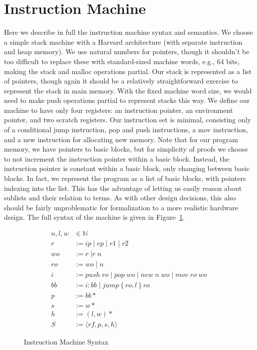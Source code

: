 \section{Instruction Machine} \label{sec:im_semantics}

Here we describe in full the instruction machine syntax and semantics. We
choose a simple stack machine with a Harvard architecture (with separate
instruction and heap memory). We use natural numbers for pointers, though it
shouldn't be too difficult to replace these with standard-sized machine words,
e.g., 64 bits, making the stack and malloc operations partial. Our stack is
represented as a list of pointers, though again it should be a relatively
straightforward exercise to represent the stack in main memory. With the fixed
machine word size, we would need to make push operations partial to represent
stacks this way. We define our machine to have only four registers: an
instruction pointer, an environment pointer, and two scratch registers. Our
instruction set is minimal, consisting only of a conditional jump instruction,
pop and push instructions, a mov instruction, and a new instruction for
allocating new memory. Note that for our program memory, we have pointers to
basic blocks, but for simplicity of proofs we choose to not increment the
instruction pointer within a basic block.  Instead, the instruction pointer is
constant within a basic block, only changing between basic blocks. In fact, we
represent the program as a list of basic blocks, with pointers indexing into the
list. This has the advantage of letting us easily reason about sublists and
their relation to terms. As with other design decisions, this also should be
fairly unproblematic for formalization to a more realistic hardware design. The
full syntax of the machine is given in Figure~\ref{fig:im_syntax}.  

\begin{figure}
\begin{align}
n, l, w &\in \mathbb{N} \tag{Machine Word} \\
r &:= ip \; | \; ep \; | \; r1 \; | \; r2 \tag{Registers} \\
wo &:= r \; | r \; n \tag{Write Operands} \\
ro &:= wo \; | \; n \tag{Read Operands} \\
i &:= push \; ro \; | \; pop \; wo \; | \; new \; n \; wo \; | \; mov \; ro \; wo \tag{Instructions} \\
bb &:= i : bb \; | \; jump \left\{ro, l\right\} ro \tag{Basic Block} \\
p &:= bb* \tag{Program} \\
s &:= w* \tag{Stack} \\
h &:= \left(l, w\right)* \tag{Heap}\\
S &:= \langle rf, p, s, h \rangle \tag{State} 
\end{align}
\caption{Instruction Machine Syntax}
\label{fig:im_syntax}
\end{figure}

